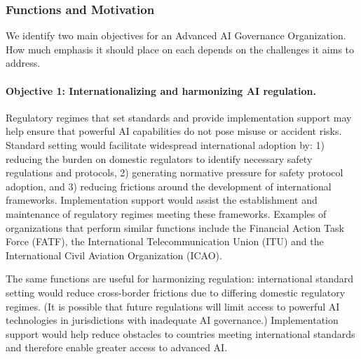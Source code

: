 \documentclass[12pt]{article}
\begin{document}
\subsubsection*{Functions and
Motivation}

We identify two main objectives for an Advanced AI Governance
Organization. How much emphasis it should place on each depends on the
challenges it aims to address.

\paragraph{Objective 1: Internationalizing and harmonizing AI regulation.}
Regulatory regimes that set standards and provide implementation support
may help ensure that powerful AI capabilities do not pose misuse or
accident risks. Standard setting would facilitate widespread
international adoption by: 1) reducing the burden on domestic regulators
to identify necessary safety regulations and protocols, 2) generating
normative pressure for safety protocol adoption, and 3) reducing
frictions around the development of international frameworks.
Implementation support would assist the establishment and maintenance of
regulatory regimes meeting these frameworks. Examples of organizations
that perform similar functions include the Financial Action Task Force
(FATF), the International Telecommunication Union (ITU) and the
International Civil Aviation Organization (ICAO).

The same functions are useful for harmonizing regulation: international
standard setting would reduce cross-border frictions due to differing
domestic regulatory regimes. (It is possible that future regulations
will limit access to powerful AI technologies in jurisdictions with
inadequate AI governance.) Implementation support would help reduce
obstacles to countries meeting international standards and therefore
enable greater access to advanced AI.
\end{document}
